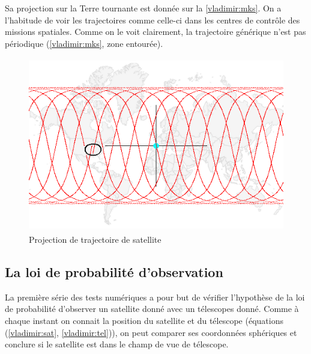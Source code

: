 

 
Sa projection sur la Terre tournante est donn\'ee sur la \autoref{vladimir:mks}. 
On a l'habitude de voir les trajectoires comme celle-ci dans les
centres de contr\^ole des missions spatiales.
 Comme on le voit clairement, la trajectoire g\'en\'erique n'est pas p\'eriodique
 (\autoref{vladimir:mks}, zone entourée).


\begin{figure}[htp] \centering
      \includegraphics*[height=3in]{mks.png}
      \caption{
            \label{vladimir:mks}
Projection de trajectoire de satellite}
 \end{figure}
 

\subsection{La loi de probabilit\'e d'observation}
La premi\`ere s\'erie des tests num\'eriques a pour but de v\'erifier
l'hypoth\`ese de la loi de probabilit\'e d'observer un satellite 
donn\'e avec un t\'elescopes donn\'e. 
Comme \`a chaque instant on connait la position du satellite et du t\'elescope
(équations (\ref{vladimir:sat}, \ref{vladimir:tel})), on peut comparer ses coordonn\'ees sph\'eriques 
et conclure si le satellite est dans le champ de vue de t\'elescope.


